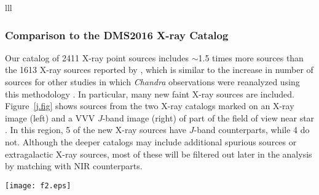 \documentclass[twocolumn,tighten]{aastex61}
\begin{document}
\begin{deluxetable}{lll}





\end{deluxetable}


\subsubsection{Comparison to the DMS2016 X-ray Catalog}

Our catalog of 2411 X-ray point sources includes $\sim$1.5 times more sources than the 1613 X-ray sources reported by , which is similar to the increase in number of sources for other studies in which {\it Chandra} observations were reanalyzed using this methodology \citep{2013ApJS..209...27K}. In particular, many new faint X-ray sources are included. Figure~\ref{j.fig} shows sources from the two X-ray catalogs marked on an X-ray image (left) and a VVV $J$-band image (right) of part of the field of view near star . In this region, 5 of the new X-ray sources have $J$-band counterparts, while 4 do not. Although the deeper catalogs may include additional spurious sources or extragalactic X-ray sources, most of these will be filtered out later in the analysis by matching with NIR counterparts.  



\begin{figure*}[t]
\centering
\texttt{[image: f2.eps]} 
\caption{X-ray sources over-plotted on the X-ray image (left) and $J$-band image (right) in the vicinity of the B0.5V star CPD$-$41~7743. X-ray source extractions for our catalog are shown in red, and the X-ray source locations from  are indicated by black boxes.   
\label{j.fig}}
\end{figure*}
\end{document}
